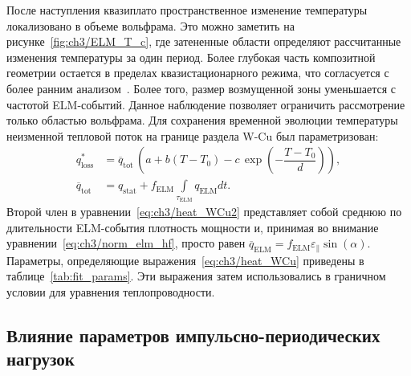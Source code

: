 После наступления квазиплато пространственное изменение температуры локализовано в объеме вольфрама. Это можно заметить на рисунке~\cref{fig:ch3/ELM_T_c}, где затененные области определяют рассчитанные изменения температуры за один период. Более глубокая часть композитной геометрии остается в пределах квазистационарного режима, что согласуется с более ранним анализом~\cite{Marenkov2012a}. Более того, размер возмущенной зоны уменьшается с частотой ELM-событий. Данное наблюдение позволяет ограничить рассмотрение только областью вольфрама. Для сохранения временной эволюции температуры неизменной тепловой поток на границе раздела W-Cu был параметризован:
\begin{subequations}
	\label{eq:ch3/heat_WCu}
	\begin{align}
		q^*_{\mathrm{loss}}         & =\overline{q}_{\mathrm{tot}}\,\left(a+b(T-T_0)-c\,\exp\left( -\dfrac{T-T_0}{d}\right)\right),\label{eq:ch3/heat_WCu1} \\
		\overline{q}_{\mathrm{tot}} & =q_{\mathrm{stat}}+f_{\mathrm{ELM}}\int\limits_{\tau_{\mathrm{ELM}}}q_{\mathrm{ELM}}dt. \label{eq:ch3/heat_WCu2}
	\end{align}
\end{subequations}
Второй член в уравнении~\cref{eq:ch3/heat_WCu2} представляет собой среднюю по длительности ELM-события плотность мощности и, принимая во внимание уравнении~\cref{eq:ch3/norm_elm_hf}, просто равен $\overline{q}_{\mathrm{ELM}}=f_{\mathrm{ELM}}\varepsilon_{\parallel}\sin(\alpha)$. Параметры, определяющие выражения~\cref{eq:ch3/heat_WCu} приведены в таблице~\cref{tab:fit_params}. Эти выражения затем использовались в граничном условии для уравнения теплопроводности.

\subsection{Влияние параметров импульсно-периодических нагрузок}\label{subsec:ch3/sec2/subsec5}

